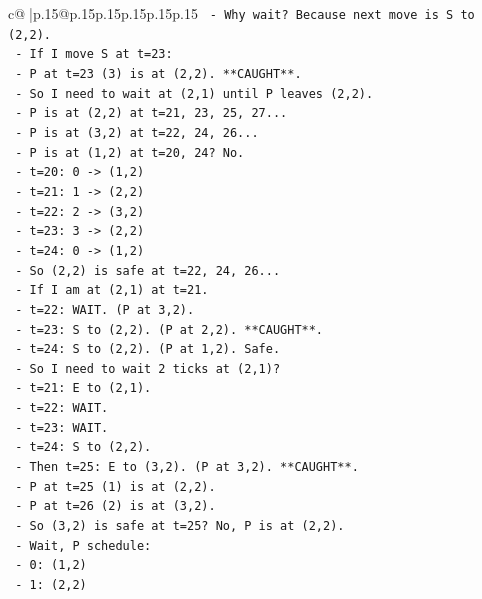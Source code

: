 \documentclass{article}
\begin{document}
{\begin{supertabular}{c@{$\;$}|p{.15\linewidth}@{}p{.15\linewidth}p{.15\linewidth}p{.15\linewidth}p{.15\linewidth}p{.15\linewidth}}
{{{\texttt{      {-} Why wait? Because next move is S to (2,2).} \\
\texttt{      {-} If I move S at t=23:} \\
\texttt{        {-} P at t=23 (3) is at (2,2). **CAUGHT**.} \\
\texttt{      {-} So I need to wait at (2,1) until P leaves (2,2).} \\
\texttt{      {-} P is at (2,2) at t=21, 23, 25, 27...} \\
\texttt{      {-} P is at (3,2) at t=22, 24, 26...} \\
\texttt{      {-} P is at (1,2) at t=20, 24? No.} \\
\texttt{        {-} t=20: 0 {-}> (1,2)} \\
\texttt{        {-} t=21: 1 {-}> (2,2)} \\
\texttt{        {-} t=22: 2 {-}> (3,2)} \\
\texttt{        {-} t=23: 3 {-}> (2,2)} \\
\texttt{        {-} t=24: 0 {-}> (1,2)} \\
\texttt{      {-} So (2,2) is safe at t=22, 24, 26...} \\
\texttt{      {-} If I am at (2,1) at t=21.} \\
\texttt{      {-} t=22: WAIT. (P at 3,2).} \\
\texttt{      {-} t=23: S to (2,2). (P at 2,2). **CAUGHT**.} \\
\texttt{      {-} t=24: S to (2,2). (P at 1,2). Safe.} \\
\texttt{      {-} So I need to wait 2 ticks at (2,1)?} \\
\texttt{        {-} t=21: E to (2,1).} \\
\texttt{        {-} t=22: WAIT.} \\
\texttt{        {-} t=23: WAIT.} \\
\texttt{        {-} t=24: S to (2,2).} \\
\texttt{      {-} Then t=25: E to (3,2). (P at 3,2). **CAUGHT**.} \\
\texttt{      {-} P at t=25 (1) is at (2,2).} \\
\texttt{      {-} P at t=26 (2) is at (3,2).} \\
\texttt{      {-} So (3,2) is safe at t=25? No, P is at (2,2).} \\
\texttt{      {-} Wait, P schedule:} \\
\texttt{        {-} 0: (1,2)} \\
\texttt{        {-} 1: (2,2)} \\
}}}
\end{supertabular}}
\end{document}
